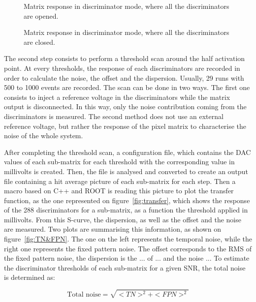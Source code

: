   \begin{figure}[!h]
    \caption{Matrix response in discriminator mode, where all the discriminators are opened.}
    \label{fig:openPixel}
  \end{figure}
  
  \begin{figure}[!h]
    \caption{Matrix response in discriminator mode, where all the discriminators are closed.}
    \label{fig:closePixel}
  \end{figure}

  The second step consists to perform a threshold scan around the half activation point.
  At every thresholds, the response of each discriminators are recorded in order to calculate the noise, the offset and the dispersion.
  Usually, 29 runs with 500 to 1000 events are recorded.
  The scan can be done in two ways.
  The first one consists to inject a reference voltage in the discriminators while the matrix output is disconnected.
  In this way, only the noise contribution coming from the discriminators is measured.
  The second method does not use an external reference voltage, but rather the response of the pixel matrix to characterise the noise of the whole system.

  After completing the threshold scan, a configuration file, which contains the DAC values of each sub-matrix for each threshold with the corresponding value in millivolts is created.
  Then, the file is analysed and converted to create an output file containing a hit average picture of each sub-matrix for each step.
  Then a macro based on C++ and ROOT is reading this picture to plot the transfer function, as the one represented on figure~\ref{fig:transfer}, which shows the response of the 288 discriminators for a sub-matrix, as a function the threshold applied in millivolts.
  From this S-curve, the dispersion, as well as the offset and the noise are measured.
  Two plots are summarising this information, as shown on figure~\ref{fig:TN&FPN}.
  The one on the left represents the temporal noise, while the right one represents the fixed pattern noise.
  The offset corresponds to the RMS of the fixed pattern noise, the dispersion is the ... of ... and the noise ...
  To estimate the discriminator thresholds of each sub-matrix for a given \gls{SNR}, the total noise is determined as:
  
  \begin{equation}
    \text{Total noise} = \sqrt{<TN>^2 + <FPN>^2}
  \end{equation}

